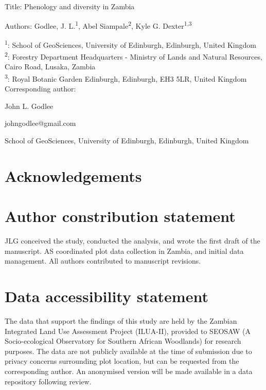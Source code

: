 \documentclass[11pt,a4paper]{article}
\newcommand{\titletext}{Phenology and diversity in Zambia}
\begin{document}
{\Large{Title: \titletext{}}}

Authors: Godlee, J. L.\textsuperscript{1}, Abel Siampale\textsuperscript{2}, Kyle G. Dexter\textsuperscript{1,3}

\textsuperscript{1}: School of GeoSciences, University of Edinburgh, Edinburgh, United Kingdom \\
\textsuperscript{2}: Forestry Department Headquarters - Ministry of Lands and Natural Resources, Cairo Road, Lusaka, Zambia \\
\textsuperscript{3}: Royal Botanic Garden Edinburgh, Edinburgh, EH3 5LR, United Kingdom \\

\vspace{1em}
Corresponding author:

John L. Godlee

johngodlee@gmail.com

School of GeoSciences, University of Edinburgh, Edinburgh, United Kingdom

\section*{Acknowledgements}

\section*{Author constribution statement}

JLG conceived the study, conducted the analysis, and wrote the first draft of the manuscript. AS coordinated plot data collection in Zambia, and initial data management. All authors contributed to manuscript revisions.  

\section*{Data accessibility statement}

The data that support the findings of this study are held by the Zambian Integrated Land Use Assessment Project (ILUA-II), provided to SEOSAW (A Socio-ecological Observatory for Southern African Woodlands) for research purposes. The data are not publicly available at the time of submission due to privacy concerns surrounding plot location, but can be requested from the corresponding author. An anonymised version will be made available in a data repository following review.

\newpage{}
\linenumbers
\end{document}
